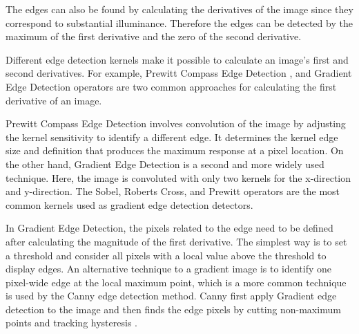 The edges can also be found by calculating the derivatives of the image since they correspond to substantial illuminance. Therefore the edges can be detected by the maximum of the first derivative and the zero of the second derivative.

Different edge detection kernels make it possible to calculate an image's first and second derivatives. For example, Prewitt Compass Edge Detection \cite{prewitt1970object}, and Gradient Edge Detection operators \cite{bovik2010handbook} are two common approaches for calculating the first derivative of an image. 

Prewitt Compass Edge Detection involves convolution of the image by adjusting the kernel sensitivity to identify a different edge. It determines the kernel edge size and definition that produces the maximum response at a pixel location. On the other hand, Gradient Edge Detection is a second and more widely used technique. Here, the image is convoluted with only two kernels for the x-direction and y-direction. The Sobel, Roberts Cross, and Prewitt operators are the most common kernels used as gradient edge detection detectors.

In Gradient Edge Detection, the pixels related to the edge need to be defined after calculating the magnitude of the first derivative. The simplest way is to set a threshold and consider all pixels with a local value above the threshold to display edges. An alternative technique to a gradient image is to identify one pixel-wide edge at the local maximum point, which is a more common technique is used by the Canny edge detection method. Canny first apply Gradient edge detection to the image and then finds the edge pixels by cutting non-maximum points and tracking hysteresis \cite{moeslund2009image}.
